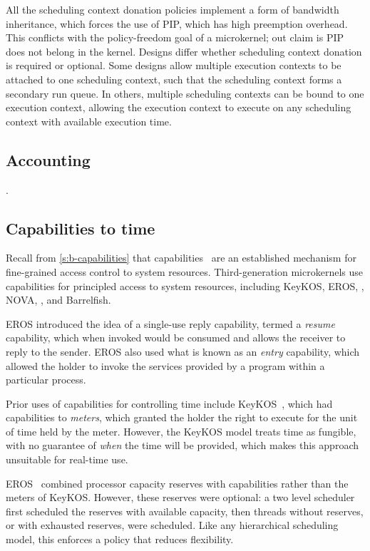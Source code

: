 All the scheduling context donation policies implement a form of bandwidth inheritance, which
forces the use of \gls{PIP}, which has high preemption overhead. This conflicts with the
policy-freedom goal of a microkernel; out claim is \gls{PIP} does not belong in the kernel. 
Designs differ whether
scheduling context donation is required or optional.  Some designs allow multiple execution contexts
to be attached to one scheduling context, such that the scheduling context forms a secondary run
queue.  In others, multiple scheduling contexts can be bound to one execution context, allowing the
execution context to execute on any scheduling context with available execution time. 


\subsection{Accounting}

.

\subsection{Capabilities to time}
\label{s:os-capabilities}

Recall from \cref{s:b-capabilities} that capabilities~\citep{Dennis_VanHorn_66} are an established mechanism for
fine-grained access control to system resources.
Third-generation microkernels use capabilities for principled access to system resources, including 
KeyKOS, EROS, \fiascooc, NOVA, \selfour, \composite and Barrelfish. 

EROS introduced the
idea of a single-use reply capability, termed a \emph{resume} capability, which when invoked would
be consumed and allows the receiver to reply to the sender.  EROS also used what is known as an
\emph{entry} capability, which allowed the holder to invoke the services provided by a program
within a particular process. 

Prior uses of capabilities for controlling time include
KeyKOS~\citep{Bomberger_FFHLS_92}, which had capabilities to \emph{meters}, which granted the holder
the right to execute for the unit of time held by the meter.
However, the KeyKOS model treats time as fungible, with no guarantee
of \emph{when} the time will be provided, which makes this approach
unsuitable for real-time use.

EROS~\citep{Shapiro_SF_99} combined processor capacity reserves with capabilities rather than the
meters of KeyKOS. However, these reserves were optional: a two level scheduler first
scheduled the reserves with available capacity, then threads without reserves,
or with exhausted reserves, were scheduled.
Like any hierarchical scheduling model, this enforces a policy that
reduces flexibility.

